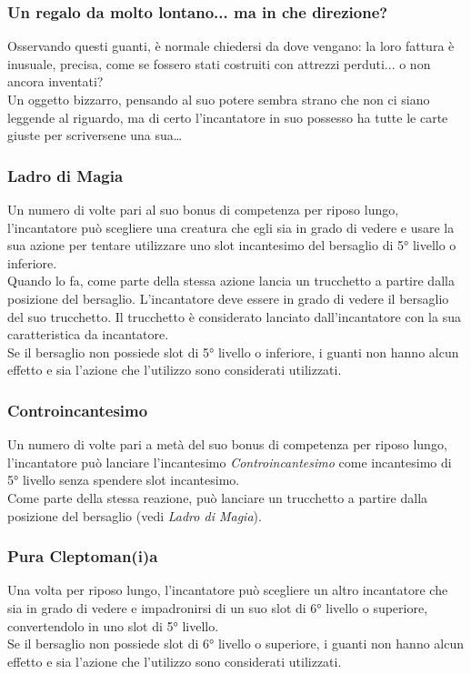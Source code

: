 \subsubsection{Un regalo da molto lontano... ma in che direzione?}
Osservando questi guanti, è normale chiedersi da dove vengano: la loro fattura è inusuale, precisa, come se fossero stati costruiti con attrezzi perduti... o non ancora inventati? \\
Un oggetto bizzarro, pensando al suo potere sembra strano che non ci siano leggende al riguardo, ma di certo l'incantatore in suo possesso ha tutte le carte giuste per scriversene una sua…

\subsubsection{Ladro di Magia}
Un numero di volte pari al suo bonus di competenza per riposo lungo, l'incantatore può scegliere una creatura che egli sia in grado di vedere e usare la sua azione per tentare utilizzare uno slot incantesimo del bersaglio di 5° livello o inferiore. \\
Quando lo fa, come parte della stessa azione lancia un trucchetto a partire dalla posizione del bersaglio. L'incantatore deve essere in grado di vedere il bersaglio del suo trucchetto. Il trucchetto è considerato lanciato dall'incantatore con la sua caratteristica da incantatore. \\ Se il bersaglio non possiede slot di 5° livello o inferiore, i guanti non hanno alcun effetto e sia l'azione che l'utilizzo sono considerati utilizzati.

\subsubsection{Controincantesimo}
Un numero di volte pari a metà del suo bonus di competenza per riposo lungo, l'incantatore può lanciare l'incantesimo \textit{Controincantesimo} come incantesimo di 5° livello senza spendere slot incantesimo. \\ Come parte della stessa reazione, può lanciare un trucchetto a partire dalla posizione del bersaglio (vedi \textit{Ladro di Magia}).

\subsubsection{Pura Cleptoman(i)a}
Una volta per riposo lungo, l'incantatore può scegliere un altro incantatore che sia in grado di vedere e impadronirsi di un suo slot di 6° livello o superiore, convertendolo in uno slot di 5° livello. \\ Se il bersaglio non possiede slot di 6° livello o superiore, i guanti non hanno alcun effetto e sia l'azione che l'utilizzo sono considerati utilizzati.

